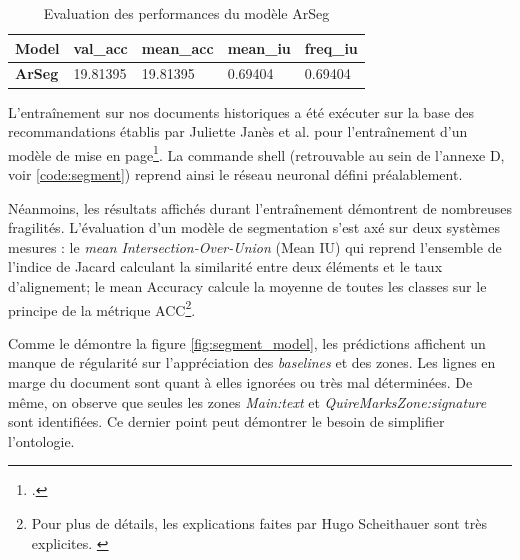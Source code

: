 	\begin{table}[]
	    \centering
        \begin{tabular}{|l|l|l|l|l|}
        \hline
        \multicolumn{1}{|c|}{\textbf{Model}} & \textbf{val\_acc} & \textbf{mean\_acc} & \textbf{mean\_iu} & \textbf{freq\_iu} \\ \hline
        \textbf{ArSeg}                       & 19.81395          & 19.81395           & 0.69404           & 0.69404           \\ \hline
        \end{tabular}
        \caption{Evaluation des performances du modèle ArSeg}
        \label{tab:ArSeg_benchmark}
    \end{table}
	
	L'entraînement sur nos documents historiques a été exécuter sur la base des recommandations établis par Juliette Janès et al. pour l'entraînement d'un modèle de mise en page\footcite{janesAutomaticTEIEncoding2021a}. La commande shell (retrouvable au sein de l'annexe D, voir \ref{code:segment}) reprend ainsi le réseau neuronal défini préalablement.
	
	Néanmoins, les résultats affichés durant l'entraînement démontrent de nombreuses fragilités. L'évaluation d'un modèle de segmentation s'est axé sur deux systèmes mesures : le \textit{mean Intersection-Over-Union} (Mean IU) qui reprend l'ensemble de l'indice de Jacard calculant la similarité entre deux éléments et le taux d'alignement;  le mean Accuracy calcule la moyenne de toutes les classes sur le principe de la métrique \gls{ACC}\footnote{Pour plus de détails, les explications faites par Hugo Scheithauer sont très explicites. \cite[p.~79-80]{scheithauerReconnaissanceEntitesNommees2021}}. 
	
	Comme le démontre la figure \ref{fig:segment_model}, les prédictions affichent un manque de régularité sur l'appréciation des \textit{baselines} et des zones. Les lignes en marge du document sont quant à elles ignorées ou très mal déterminées. De même, on observe que seules les zones \textit{Main:text} et \textit{QuireMarksZone:signature} sont identifiées. Ce dernier point peut démontrer le besoin de simplifier l'ontologie.
	
